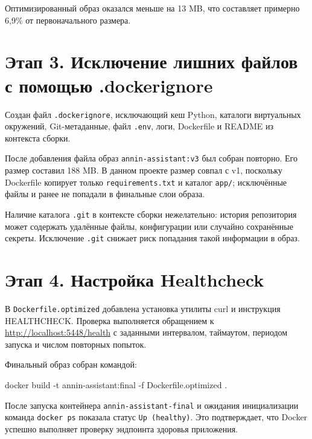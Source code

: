 Оптимизированный образ оказался меньше на 13 MB, что составляет
примерно 6,9\% от первоначального размера.


\section{Этап 3. Исключение лишних файлов с помощью .dockerignore}

Создан файл \texttt{.dockerignore}, исключающий кеш Python, каталоги
виртуальных окружений, Git-метаданные, файл \texttt{.env}, логи,
Dockerfile и README из контекста сборки.

После добавления файла образ \texttt{annin-assistant:v3} был собран
повторно. Его размер составил 188 MB. В данном проекте размер совпал
с v1, поскольку Dockerfile копирует только \texttt{requirements.txt}
и каталог \texttt{app/}; исключённые файлы и ранее не попадали в
финальные слои образа.

Наличие каталога \texttt{.git} в контексте сборки нежелательно:
история репозитория может содержать удалённые файлы, конфигурации
или случайно сохранённые секреты. Исключение \texttt{.git} снижает
риск попадания такой информации в образ.


\section{Этап 4. Настройка Healthcheck}

В \texttt{Dockerfile.optimized} добавлена установка утилиты curl
и инструкция HEALTHCHECK. Проверка выполняется обращением к
\url{http://localhost:5448/health} с заданными интервалом,
таймаутом, периодом запуска и числом повторных попыток.

Финальный образ собран командой:

\begin{code}
docker build -t annin-assistant:final -f Dockerfile.optimized .
\end{code}

После запуска контейнера \texttt{annin-assistant-final} и ожидания
инициализации команда \texttt{docker ps} показала статус
\texttt{Up (healthy)}. Это подтверждает, что Docker успешно выполняет
проверку эндпоинта здоровья приложения.

